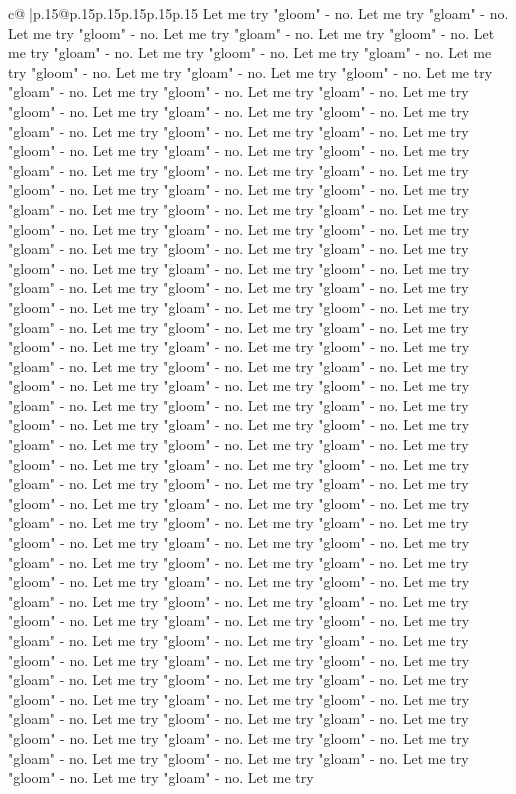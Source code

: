 \documentclass{article}
\begin{document}
{\begin{supertabular}{c@{$\;$}|p{.15\linewidth}@{}p{.15\linewidth}p{.15\linewidth}p{.15\linewidth}p{.15\linewidth}p{.15\linewidth}}
{{{Let me try "gloom" {-} no. Let me try "gloam" {-} no. Let me try "gloom" {-} no. Let me try "gloam" {-} no. Let me try "gloom" {-} no. Let me try "gloam" {-} no. Let me try "gloom" {-} no. Let me try "gloam" {-} no. Let me try "gloom" {-} no. Let me try "gloam" {-} no. Let me try "gloom" {-} no. Let me try "gloam" {-} no. Let me try "gloom" {-} no. Let me try "gloam" {-} no. Let me try "gloom" {-} no. Let me try "gloam" {-} no. Let me try "gloom" {-} no. Let me try "gloam" {-} no. Let me try "gloom" {-} no. Let me try "gloam" {-} no. Let me try "gloom" {-} no. Let me try "gloam" {-} no. Let me try "gloom" {-} no. Let me try "gloam" {-} no. Let me try "gloom" {-} no. Let me try "gloam" {-} no. Let me try "gloom" {-} no. Let me try "gloam" {-} no. Let me try "gloom" {-} no. Let me try "gloam" {-} no. Let me try "gloom" {-} no. Let me try "gloam" {-} no. Let me try "gloom" {-} no. Let me try "gloam" {-} no. Let me try "gloom" {-} no. Let me try "gloam" {-} no. Let me try "gloom" {-} no. Let me try "gloam" {-} no. Let me try "gloom" {-} no. Let me try "gloam" {-} no. Let me try "gloom" {-} no. Let me try "gloam" {-} no. Let me try "gloom" {-} no. Let me try "gloam" {-} no. Let me try "gloom" {-} no. Let me try "gloam" {-} no. Let me try "gloom" {-} no. Let me try "gloam" {-} no. Let me try "gloom" {-} no. Let me try "gloam" {-} no. Let me try "gloom" {-} no. Let me try "gloam" {-} no. Let me try "gloom" {-} no. Let me try "gloam" {-} no. Let me try "gloom" {-} no. Let me try "gloam" {-} no. Let me try "gloom" {-} no. Let me try "gloam" {-} no. Let me try "gloom" {-} no. Let me try "gloam" {-} no. Let me try "gloom" {-} no. Let me try "gloam" {-} no. Let me try "gloom" {-} no. Let me try "gloam" {-} no. Let me try "gloom" {-} no. Let me try "gloam" {-} no. Let me try "gloom" {-} no. Let me try "gloam" {-} no. Let me try "gloom" {-} no. Let me try "gloam" {-} no. Let me try "gloom" {-} no. Let me try "gloam" {-} no. Let me try "gloom" {-} no. Let me try "gloam" {-} no. Let me try "gloom" {-} no. Let me try "gloam" {-} no. Let me try "gloom" {-} no. Let me try "gloam" {-} no. Let me try "gloom" {-} no. Let me try "gloam" {-} no. Let me try "gloom" {-} no. Let me try "gloam" {-} no. Let me try "gloom" {-} no. Let me try "gloam" {-} no. Let me try "gloom" {-} no. Let me try "gloam" {-} no. Let me try "gloom" {-} no. Let me try "gloam" {-} no. Let me try "gloom" {-} no. Let me try "gloam" {-} no. Let me try "gloom" {-} no. Let me try "gloam" {-} no. Let me try "gloom" {-} no. Let me try "gloam" {-} no. Let me try "gloom" {-} no. Let me try "gloam" {-} no. Let me try "gloom" {-} no. Let me try "gloam" {-} no. Let me try "gloom" {-} no. Let me try "gloam" {-} no. Let me try "gloom" {-} no. Let me try "gloam" {-} no. Let me try "gloom" {-} no. Let me try "gloam" {-} no. Let me try "gloom" {-} no. Let me try "gloam" {-} no. Let me try "gloom" {-} no. Let me try "gloam" {-} no. Let me try "gloom" {-} no. Let me try "gloam" {-} no. Let me try "gloom" {-} no. Let me try "gloam" {-} no. Let me try "gloom" {-} no. Let me try "gloam" {-} no. Let me try "gloom" {-} no. Let me try "gloam" {-} no. Let me try "gloom" {-} no. Let me try "gloam" {-} no. Let me try }}}
\end{supertabular}}
\end{document}
